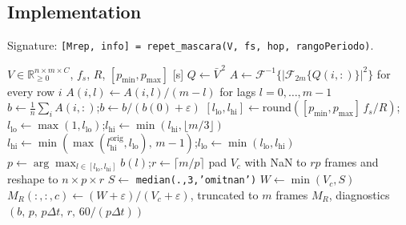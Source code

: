 \documentclass[11pt,a4paper]{article}
\newcommand{\code}[1]{\texttt{#1}}
\newcommand{\R}{\mathbb{R}}
\begin{document}
\subsection{Implementation}
Signature: \code{[Mrep, info] = repet\_mascara(V, fs, hop, rangoPeriodo)}.

\begin{algorithm}[htbp]
\caption{Original REPET mask (\code{repet\_mascara})}
\begin{algorithmic}[1]
\Require $V\in\R_{\ge0}^{n\times m\times C}$, $f_s$, $R$, $[p_{\min},p_{\max}]$ [s]
\State $Q \gets \bar V^{\,2}$ \Comment{\code{mean(V,3).\^{}2}, $n\times m$}
\State $A \gets \mathcal F^{-1}\big\{|\mathcal F_{2m}\{Q(i,:)\}|^2\big\}$ for every row $i$
\State $A(i,l) \gets A(i,l)/(m-l)$ for lags $l=0,\dots,m-1$ 
\State $b \gets \frac1n\sum_i A(i,:)$;\quad $b\gets b/(b(0)+\varepsilon)$
\State $[l_{\text{lo}},l_{\text{hi}}] \gets \mathrm{round}([p_{\min},p_{\max}]\,f_s/R)$;\quad
       $l_{\text{lo}}\gets\max(1,l_{\text{lo}})$;\quad $l_{\text{hi}}\gets\min(l_{\text{hi}},\lfloor m/3\rfloor)$
 
   \State $l_{\text{hi}}\gets\min(\max(l_{\text{hi}}^{\text{orig}},l_{\text{lo}}),\,m-1)$;\quad $l_{\text{lo}}\gets\min(l_{\text{lo}},l_{\text{hi}})$
\EndIf
\State $p \gets \arg\max_{l\in[l_{\text{lo}},l_{\text{hi}}]} b(l)$;\quad $r\gets\lceil m/p\rceil$
   \State pad $V_c$ with NaN to $rp$ frames and reshape to $n\times p\times r$
   \State $S \gets$ \code{median(.,3,'omitnan')} 
   \State $W \gets \min(V_c, S)$ 
   \State $M_R(:,:,c) \gets (W+\varepsilon)/(V_c+\varepsilon)$, truncated to $m$ frames 
\EndFor
\State \Return $M_R$, diagnostics $(b,\,p,\,p\Delta t,\,r,\,60/(p\Delta t))$
\end{algorithmic}
\end{algorithm}
\end{document}
